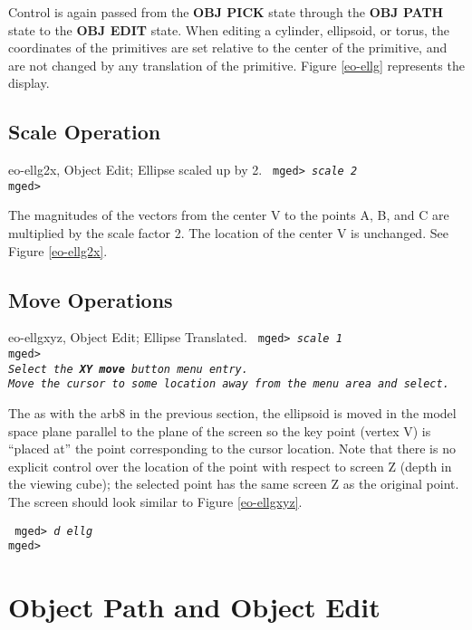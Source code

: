 Control is again passed from the {\bf OBJ PICK} state through the
{\bf OBJ PATH} state to the {\bf OBJ EDIT} state.
When editing a cylinder, ellipsoid, or torus, the coordinates of the
primitives are set relative to the center of the primitive, and are not
changed by any translation of the primitive.  Figure \ref{eo-ellg}
represents the display.

\subsection{Scale Operation}

\mfig eo-ellg2x, Object Edit; Ellipse scaled up by 2.
\noindent
{\tt
mged> {\em scale 2}\\
mged>\\
}

The magnitudes of the vectors from the center V to the points A, B, and C
are multiplied by the scale factor 2.  The location of the center V is
unchanged.  See Figure \ref{eo-ellg2x}.

\subsection{Move Operations}

\mfig eo-ellgxyz, Object Edit; Ellipse Translated.
\noindent
{\tt
mged> {\em scale 1}\\
mged>\\
{\em Select the {\bf XY move} button menu entry.}\\
{\em Move the cursor to some location away from the menu area and select.}\\
}

The as with the arb8 in the previous section, the ellipsoid is moved
in the model space plane parallel to the plane of the screen so the
key point (vertex V) is ``placed at'' the point corresponding to the
cursor location.  Note that there is no explicit control over the
location of the point with respect to screen Z (depth in the viewing
cube); the selected point has the same screen Z as the original point.
The screen should look similar to Figure \ref{eo-ellgxyz}.

\noindent
{\tt
mged> {\em d ellg}\\
mged>\\
}

\section{Object Path and Object Edit}

